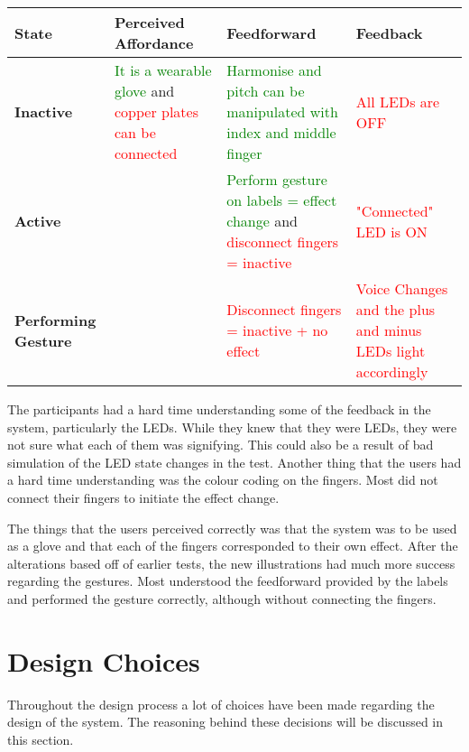 \begin{center}
  \begin{tabular}{| C{2cm} | C{3cm} | C{3cm} | C{3cm} |}
    \hline
    \textbf{State} & \textbf{Perceived Affordance} & \textbf{Feedforward} & \textbf{Feedback} \\ \hline
    \textbf{Inactive} & \textcolor{green}{It is a wearable glove} and \textcolor{red}{copper plates can be connected} & \textcolor{green}{Harmonise and pitch can be manipulated with index and middle finger} & \textcolor{red}{All LEDs are OFF} \\ \hline
    \textbf{Active} &  & \textcolor{green}{Perform gesture on labels = effect change} and \textcolor{red}{disconnect fingers = inactive} & \textcolor{red}{"Connected" LED is ON} \\ \hline        
    \textbf{Performing Gesture} &  & \textcolor{red}{Disconnect fingers = inactive + no effect} & \textcolor{red}{Voice Changes and the plus and minus LEDs light accordingly} \\ \hline
  \end{tabular}
\end{center}

The participants had a hard time understanding some of the feedback in the system, particularly the LEDs. While they knew that they were LEDs, they were not sure what each of them was signifying. This could also be a result of bad simulation of the LED state changes in the test.
Another thing that the users had a hard time understanding was the colour coding on the fingers. Most did not connect their fingers to initiate the effect change.

The things that the users perceived correctly was that the system was to be used as a glove and that each of the fingers corresponded to their own effect. After the alterations based off of earlier tests, the new illustrations had much more success regarding the gestures. Most understood the feedforward provided by the labels and performed the gesture correctly, although without connecting the fingers.

\section{Design Choices}

Throughout the design process a lot of choices have been made regarding the design of the system. The reasoning behind these decisions will be discussed in this section.\\

